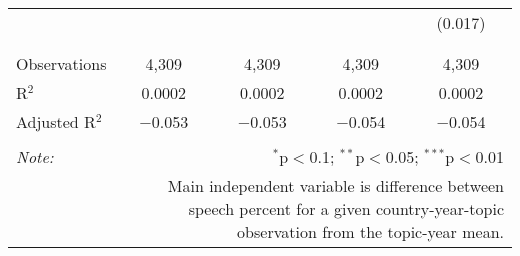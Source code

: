 \begin{table}[!htbp]
\begin{tabular}{@{\extracolsep{5pt}}lcccc}
  &  &  &  & (0.017) \\ 
  & & & & \\ 
\hline \\[-1.8ex] 
Observations & 4,309 & 4,309 & 4,309 & 4,309 \\ 
R$^{2}$ & 0.0002 & 0.0002 & 0.0002 & 0.0002 \\ 
Adjusted R$^{2}$ & $-$0.053 & $-$0.053 & $-$0.054 & $-$0.054 \\ 
\hline 
\hline \\[-1.8ex] 
\textit{Note:}  & \multicolumn{4}{r}{$^{*}$p$<$0.1; $^{**}$p$<$0.05; $^{***}$p$<$0.01} \\ 
 & \multicolumn{4}{r}{Main independent variable is difference between speech percent for a given country-year-topic observation from the topic-year mean.} \\ 
\end{tabular} 
\end{table} 

